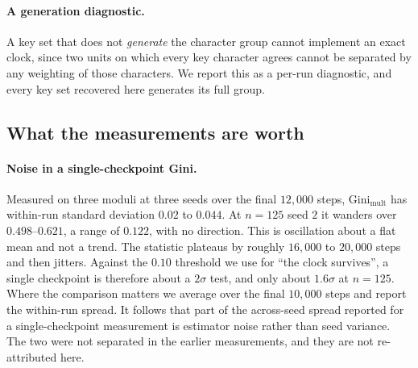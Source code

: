 \paragraph{A generation diagnostic.} A key set that does not \emph{generate}
the character group cannot implement an exact clock, since two units on which every key
character agrees cannot be separated by any weighting of those characters. We report this as a
per-run diagnostic, and every key set recovered here generates its full group.

\subsection{What the measurements are worth}
\label{sec:methods-validity}

\paragraph{Noise in a single-checkpoint Gini.} Measured on three moduli at three
seeds over the final $12{,}000$ steps, $\mathrm{Gini}_{\text{mult}}$ has within-run standard
deviation $0.02$ to $0.044$. At $n = 125$ seed $2$ it wanders over $0.498$--$0.621$, a range of
$0.122$, with no direction. This is oscillation about a flat mean and not a trend. The
statistic plateaus by roughly $16{,}000$ to $20{,}000$ steps and then jitters. Against the
$0.10$ threshold we use for ``the clock survives'', a single checkpoint is therefore about a
$2\sigma$ test, and only about $1.6\sigma$ at $n = 125$. Where the comparison matters we
average over the final $10{,}000$ steps and report the within-run spread. It follows that part
of the across-seed spread reported for a single-checkpoint measurement is estimator noise
rather than seed variance. The two were not separated in the earlier measurements, and they are
not re-attributed here.

